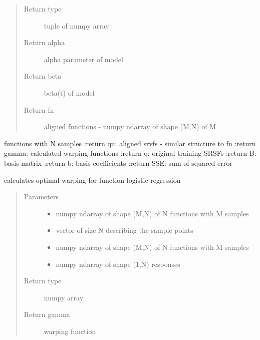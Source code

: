 \documentclass[letterpaper,10pt,english]{sphinxmanual}
\begin{document}
\begin{fulllineitems}
\begin{quote}
\begin{description}
\item[{Return type}] \leavevmode
tuple of numpy array

\item[{Return alpha}] \leavevmode
alpha parameter of model

\item[{Return beta}] \leavevmode
beta(t) of model

\item[{Return fn}] \leavevmode
aligned functions - numpy ndarray of shape (M,N) of M

\end{description}\end{quote}

functions with N samples
:return qn: aligned srvfs - similar structure to fn
:return gamma: calculated warping functions
:return q: original training SRSFs
:return B: basis matrix
:return b: basis coefficients
:return SSE: sum of squared error

\end{fulllineitems}


\begin{fulllineitems}
\label{\detokenize{regression:regression.logistic_warp}}
calculates optimal warping for function logistic regression
\begin{quote}\begin{description}
\item[{Parameters}] \leavevmode\begin{itemize}
\item {} 
 \textendash{} numpy ndarray of shape (M,N) of N functions with M samples

\item {} 
 \textendash{} vector of size N describing the sample points

\item {} 
 \textendash{} numpy ndarray of shape (M,N) of N functions with M samples

\item {} 
 \textendash{} numpy ndarray of shape (1,N) responses

\end{itemize}

\item[{Return type}] \leavevmode
numpy array

\item[{Return gamma}] \leavevmode
warping function

\end{description}\end{quote}

\end{fulllineitems}
\end{document}
